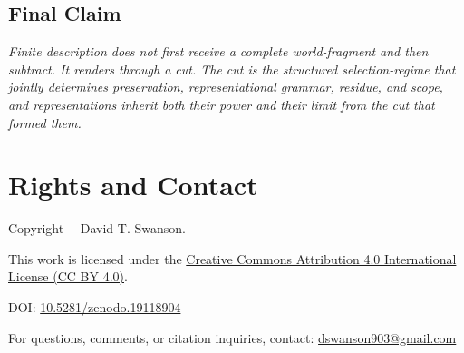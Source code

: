 \documentclass[11pt]{article}
\renewenvironment{quote}
  {\list{}{\leftmargin=1.4em \rightmargin=1.0em}%
   \item\relax\color{softink}\itshape}
  {\endlist}
\begin{document}
\subsection{Final Claim}

\begin{quote}
Finite description does not first receive a complete world-fragment and then subtract. It renders through a cut. The cut is the structured selection-regime that jointly determines preservation, representational grammar, residue, and scope, and representations inherit both their power and their limit from the cut that formed them.
\end{quote}


\appendix
\section*{Rights and Contact}

\noindent
Copyright \textcopyright\ \the\year\ David T. Swanson.

\noindent
This work is licensed under the
\href{https://creativecommons.org/licenses/by/4.0/}
{Creative Commons Attribution 4.0 International License (CC BY 4.0)}.

\noindent
DOI:
\href{https://doi.org/10.5281/zenodo.19118904}{10.5281/zenodo.19118904}

\noindent
For questions, comments, or citation inquiries, contact:
\href{mailto:dswanson903@gmail.com}{dswanson903@gmail.com}
\end{document}
